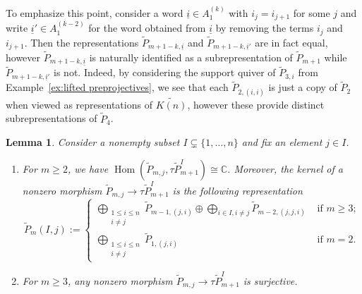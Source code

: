 \documentclass{amsart}
\newtheorem{lemma}[theorem]{Lemma}
\numberwithin{equation}{section}
\newcommand{\ui}{{\underline i}}
\newcommand{\CC}{\mathbb{C}}
\newcommand{\Hom}{\operatorname{Hom}}
\begin{document}
To emphasize this point, consider a word $\ui\in A_1^{(k)}$ with $i_j=i_{j+1}$ for some $j$ and write $\ui'\in A_1^{(k-2)}$ for the word obtained from $\ui$ by removing the terms $i_j$ and $i_{j+1}$.
Then the representations $\tilde P_{m+1-k,\ui}$ and $\tilde P_{m+1-k,\ui'}$ are in fact equal, however $\tilde P_{m+1-k,\ui}$ is naturally identified as a subrepresentation of $\tilde P_{m+1}$ while $\tilde P_{m+1-k,\ui'}$ is not.
Indeed, by considering the support quiver of $\tilde P_{3,i}$ from Example~\ref{ex:lifted preprojectives}, we see that each $\tilde P_{2,(i,i)}$ is just a copy of $\tilde P_2$ when viewed as representations of $\widetilde{K(n)}$, however these provide distinct subrepresentations of $\tilde P_4$.
\begin{lemma}
  \label{le:special subrepresentations}
  Consider a nonempty subset $I\subsetneq\{1,\ldots,n\}$ and fix an element $j\in I$. 
  \begin{enumerate}
    \item For $m\ge2$, we have $\Hom(\tilde P_{m,j},\tau\tilde P_{m+1}^I)\cong\CC$.
      Moreover, the kernel of a nonzero morphism $\tilde P_{m,j}\to\tau\tilde P_{m+1}^I$ is the following representation 
      \[\tilde P_m(I,j):=
        \begin{cases}
          \bigoplus_{\substack{1\leq i\leq n\\i\neq j}}\tilde P_{m-1,(j,i)}\oplus \bigoplus_{i\in I, i\ne j}\tilde P_{m-2,(j,j,i)} & \text{ if $m\geq 3$;}\\
          \bigoplus_{\substack{1\leq i\leq n\\i\neq j}}\tilde P_{1,(j,i)} & \text{ if $m=2$.}
        \end{cases}\]
    \item For $m\ge3$, any nonzero morphism $\tilde P_{m,j}\to\tau\tilde P_{m+1}^I$ is surjective.
  \end{enumerate}
\end{lemma}
\end{document}
